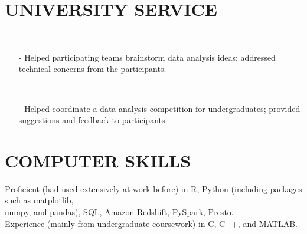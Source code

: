 \documentclass{res}
\begin{document}
\begin{resume}
\section{UNIVERSITY SERVICE}   
  \\ 
    \begin{itemize}\setlength\itemsep{0em}
    \item[-] Helped participating teams brainstorm data analysis ideas; addressed technical concerns from the participants.
    \end{itemize}

  \\ 
    \begin{itemize}\setlength\itemsep{0em}
    \item[-] Helped coordinate a data analysis competition for undergraduates; provided suggestions and feedback to participants.
    \end{itemize}

            
\section{COMPUTER SKILLS}          
    Proficient (had used extensively at work before) in R, Python (including packages such as matplotlib, \\numpy, and pandas), SQL, Amazon Redshift, PySpark, Presto. \\
    Experience (mainly from undergraduate coursework) in C, C++, and MATLAB. \\
 

\end{resume}
\end{document}
